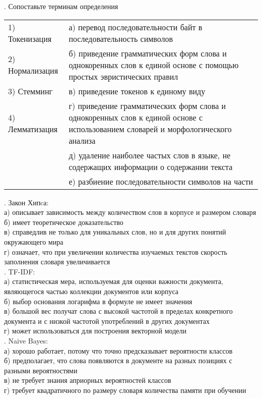 \documentclass[10pt,a4paper]{article}
\begin{document}
\vspace{2em}
. Сопоставьте терминам определения \\

\begin{tabular}{l p{12cm}}
1) Токенизация & а) перевод последовательности байт в последовательность символов \\
2) Нормализация &  б) приведение грамматических форм слова и однокоренных слов к единой основе с помощью простых эвристических правил \\
3) Стемминг  & в) приведение токенов к единому виду \\
4) Лемматизация & г) приведение грамматических форм слова и однокоренных слов к единой основе с использованием словарей и морфологического анализа \\
& д) удаление наиболее частых слов в языке, не содержащих информации о содержании текста \\
& е) разбиение последовательности символов на части \\
\end{tabular}
\vspace{1em}

. Закон Хипcа: \\
а) описывает зависимость между количеством слов в корпусе и размером словаря \\
б) имеет теоретическое доказательство \\
в) справедлив не только для уникальных слов, но и для других понятий окружающего мира \\
г) означает, что при увеличении количества изучаемых текстов скорость заполнения словаря увеличивается \\

. TF-IDF: \\
а) статистическая мера, используемая для оценки важности документа, являющегося частью коллекции документов или корпуса \\
б) выбор основания логарифма в формуле не имеет значения \\
в) большой вес получат слова с высокой частотой в пределах конкретного документа и с низкой частотой употреблений в других документах \\
г) может использоваться для построения векторной модели \\

. Naive Bayes: \\
а) хорошо работает, потому что точно предсказывает вероятности классов \\
б) предполагает, что слова появляются в документе на разных позициях с разными вероятностями \\
в) не требует знания априорных вероятностей классов \\
г) требует квадратичного по размеру словаря количества памяти при обучении
\end{document}
